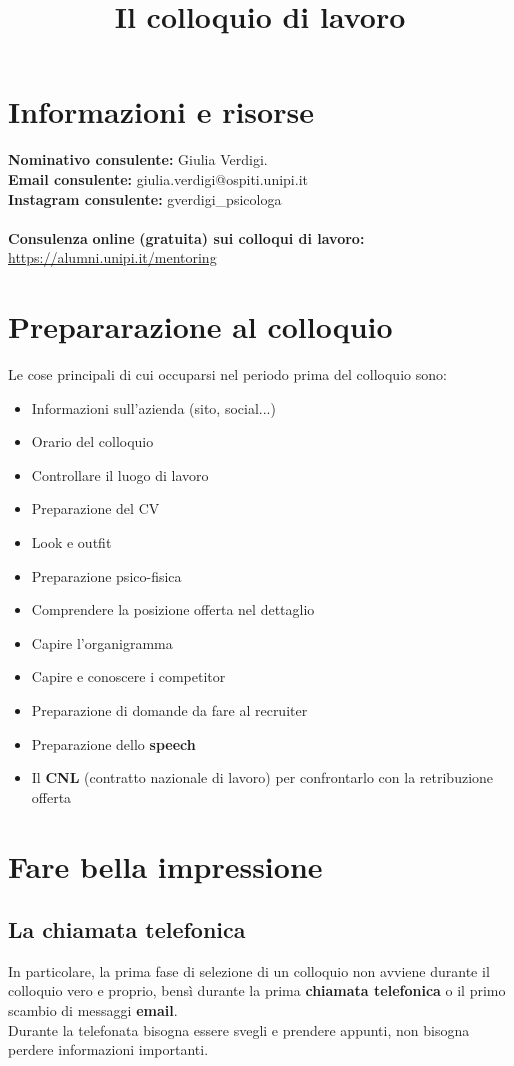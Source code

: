 \documentclass[12pt,a4paper]{article}
\title{Il colloquio di lavoro}
\author{}
\date{}
\let\oldsection\section
\renewcommand{\section}{\clearpage\oldsection}
\begin{document}
\maketitle
\tableofcontents

\section{Informazioni e risorse}
\textbf{Nominativo consulente:} Giulia Verdigi.\\
\textbf{Email consulente:} giulia.verdigi@ospiti.unipi.it\\
\textbf{Instagram consulente:} gverdigi\_psicologa\\\\
\textbf{Consulenza} \textbf{online} \textbf{(gratuita) sui colloqui di lavoro:}
\href{https://alumni.unipi.it/mentoring}{https://alumni.unipi.it/mentoring}

\section{Prepararazione al colloquio}
Le cose principali di cui occuparsi nel periodo prima del colloquio sono:
\begin{itemize}
    \item Informazioni sull'azienda (sito, social...)
    \item Orario del colloquio
    \item Controllare il luogo di lavoro
    \item Preparazione del CV
    \item Look e outfit
    \item Preparazione psico-fisica
    \item Comprendere la posizione offerta nel dettaglio
    \item Capire l'organigramma
    \item Capire e conoscere i competitor
    \item Preparazione di domande da fare al recruiter
    \item Preparazione dello \textbf{speech}
    \item Il \textbf{CNL} (contratto nazionale di lavoro) per confrontarlo con la retribuzione offerta
\end{itemize}
\section{Fare bella impressione}
\subsection{La chiamata telefonica}
In particolare, la prima fase di selezione di un colloquio non avviene durante il colloquio vero e proprio, bensì durante la prima \textbf{chiamata telefonica} o il primo scambio di messaggi \textbf{email}.\\
Durante la telefonata bisogna essere svegli e prendere appunti, non bisogna perdere informazioni importanti.
\end{document}

